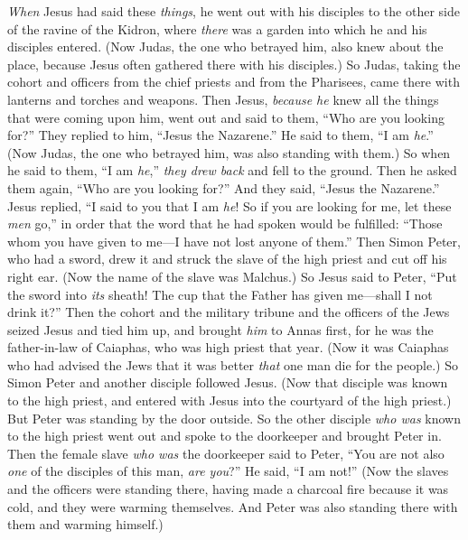 \begin{biblechapter} %
 \textit{When} Jesus had said these \textit{things}, he went out with his disciples to the other side of the ravine of the Kidron, where \textit{there} was a garden into which he and his disciples entered.
\verse (Now Judas, the one who betrayed him, also knew about the place, because Jesus often gathered there with his disciples.)
\verse So Judas, taking the cohort and officers from the chief priests and from the Pharisees, came there with lanterns and torches and weapons.
\verse Then Jesus, \textit{because he} knew all the things that were coming upon him, went out and said to them, “Who are you looking for?”
\verse They replied to him, “Jesus the Nazarene.” He said to them, “I am \textit{he}.” (Now Judas, the one who betrayed him, was also standing with them.)
\verse So when he said to them, “I am \textit{he},” \textit{they drew back} and fell to the ground.
\verse Then he asked them again, “Who are you looking for?” And they said, “Jesus the Nazarene.”
\verse Jesus replied, “I said to you that I am \textit{he}! So if you are looking for me, let these \textit{men} go,”
\verse in order that the word that he had spoken would be fulfilled: “Those whom you have given to me—I have not lost anyone of them.”
\verse Then Simon Peter, who had a sword, drew it and struck the slave of the high priest and cut off his right ear. (Now the name of the slave was Malchus.)
\verse So Jesus said to Peter, “Put the sword into \textit{its} sheath! The cup that the Father has given me—shall I not drink it?”
 Then the cohort and the military tribune and the officers of the Jews seized Jesus and tied him up,
\verse and brought \textit{him} to Annas first, for he was the father-in-law of Caiaphas, who was high priest that year.
\verse (Now it was Caiaphas who had advised the Jews that it was better \textit{that} one man die for the people.)
 So Simon Peter and another disciple followed Jesus. (Now that disciple was known to the high priest, and entered with Jesus into the courtyard of the high priest.)
\verse But Peter was standing by the door outside. So the other disciple \textit{who was} known to the high priest went out and spoke to the doorkeeper and brought Peter in.
\verse Then the female slave \textit{who was} the doorkeeper said to Peter, “You are not also \textit{one} of the disciples of this man, \textit{are you}?” He said, “I am not!”
\verse (Now the slaves and the officers were standing there, having made a charcoal fire because it was cold, and they were warming themselves. And Peter was also standing there with them and warming himself.)

\end{biblechapter}
